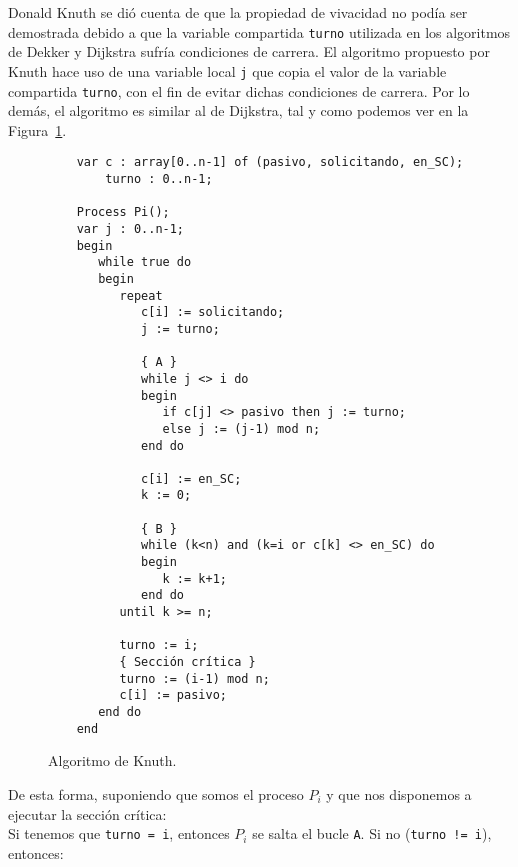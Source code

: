 Donald Knuth se dió cuenta de que la propiedad de vivacidad no podía ser demostrada debido a que la variable compartida \verb|turno| utilizada en los algoritmos de Dekker y Dijkstra sufría condiciones de carrera. El algoritmo propuesto por Knuth hace uso de una variable local \verb|j| que copia el valor de la variable compartida \verb|turno|, con el fin de evitar dichas condiciones de carrera. Por lo demás, el algoritmo es similar al de Dijkstra, tal y como podemos ver en la Figura~\ref{fig:cod_knuth}.

\begin{figure}[H]
\begin{verbatim}
    var c : array[0..n-1] of (pasivo, solicitando, en_SC);
        turno : 0..n-1;

    Process Pi();
    var j : 0..n-1;
    begin
       while true do
       begin
          repeat
             c[i] := solicitando;
             j := turno;

             { A }
             while j <> i do
             begin
                if c[j] <> pasivo then j := turno;
                else j := (j-1) mod n;
             end do

             c[i] := en_SC;
             k := 0;

             { B }
             while (k<n) and (k=i or c[k] <> en_SC) do
             begin
                k := k+1;
             end do
          until k >= n;

          turno := i;
          { Sección crítica }
          turno := (i-1) mod n;
          c[i] := pasivo;
       end do
    end
\end{verbatim}
\caption{Algoritmo de Knuth.}
\label{fig:cod_knuth}
\end{figure}
De esta forma, suponiendo que somos el proceso $P_i$ y que nos disponemos a ejecutar la sección crítica:\\
Si tenemos que \verb|turno = i|, entonces $P_i$ se salta el bucle \verb|A|. Si no (\verb|turno != i|), entonces:
